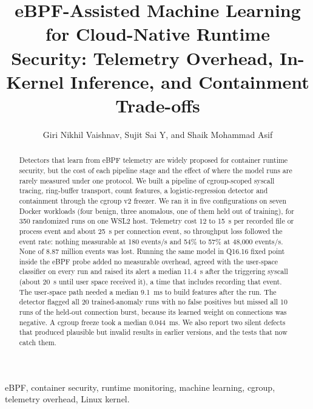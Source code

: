 \documentclass[journal]{IEEEtran}
\begin{document}
\title{eBPF-Assisted Machine Learning for Cloud-Native Runtime Security: Telemetry Overhead, In-Kernel Inference, and Containment Trade-offs}

\author{Giri Nikhil Vaishnav, Sujit Sai Y, and Shaik Mohammad Asif}


\maketitle

\begin{abstract}
Detectors that learn from eBPF telemetry are widely proposed for container runtime security, but the cost of each pipeline stage and the effect of where the model runs are rarely measured under one protocol. We built a pipeline of cgroup-scoped syscall tracing, ring-buffer transport, count features, a logistic-regression detector and containment through the cgroup v2 freezer. We ran it in five configurations on seven Docker workloads (four benign, three anomalous, one of them held out of training), for 350 randomized runs on one WSL2 host. Telemetry cost 12 to 15~\textmu s per recorded file or process event and about 25~\textmu s per connection event, so throughput loss followed the event rate: nothing measurable at 180 events/s and 54\% to 57\% at 48{,}000 events/s. None of 8.87 million events was lost. Running the same model in Q16.16 fixed point inside the eBPF probe added no measurable overhead, agreed with the user-space classifier on every run and raised its alert a median 11.4~\textmu s after the triggering syscall (about 20~\textmu s until user space received it), a time that includes recording that event. The user-space path needed a median 9.1~ms to build features after the run. The detector flagged all 20 trained-anomaly runs with no false positives but missed all 10 runs of the held-out connection burst, because its learned weight on connections was negative. A cgroup freeze took a median 0.044~ms. We also report two silent defects that produced plausible but invalid results in earlier versions, and the tests that now catch them.
\end{abstract}

\begin{IEEEkeywords}
eBPF, container security, runtime monitoring, machine learning, cgroup, telemetry overhead, Linux kernel.
\end{IEEEkeywords}










\printbibliography[title={References}]
\end{document}
